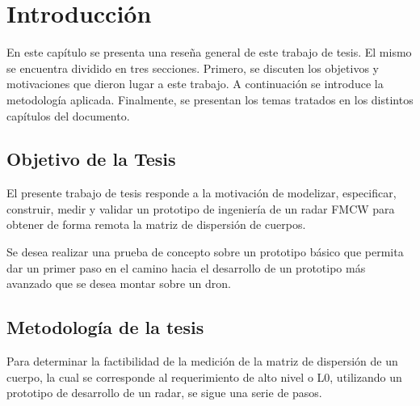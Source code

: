 
\chapter{Introducción}  %

\ifpdf
    \graphicspath{{Chapter1/Figs/Raster/}{Chapter1/Figs/PDF/}{Chapter1/Figs/}}
\else
    \graphicspath{{Chapter1/Figs/Vector/}{Chapter1/Figs/}}
\fi

En este capítulo se presenta una reseña general de este trabajo de tesis. El mismo se encuentra dividido en tres secciones. Primero, se discuten los objetivos y motivaciones que dieron lugar a este trabajo. A continuación se introduce la metodología aplicada. Finalmente, se presentan los temas tratados en los distintos capítulos del documento.

\section{Objetivo de la Tesis} \label{sc:objective}

El presente trabajo de tesis responde a la motivación de modelizar, especificar, construir, medir y validar un prototipo de ingeniería de un radar FMCW para obtener de forma remota la matriz de dispersión de cuerpos. 

Se desea realizar una prueba de concepto sobre un prototipo básico que permita dar un primer paso en el camino hacia el desarrollo de un prototipo más avanzado que se desea montar sobre un dron.


\section{Metodología de la tesis} \label{sc:methodology}

Para determinar la factibilidad de la medición de la matriz de dispersión de un cuerpo, la cual se corresponde al requerimiento de alto nivel o L0, utilizando un prototipo de desarrollo de un radar, se sigue una serie de pasos. 


